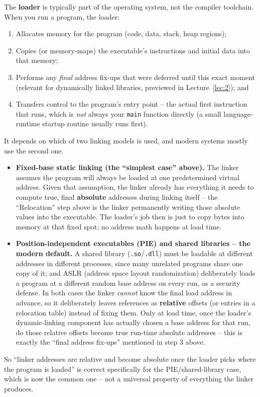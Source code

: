 \documentclass[full-course-notes.tex]{subfiles}
\begin{document}
\begin{coreidea}
The \textbf{loader} is typically part of the operating system, not the compiler toolchain. When
you run a program, the loader:
\begin{enumerate}
  \item Allocates memory for the program (code, data, stack, heap regions);
  \item Copies (or memory-maps) the executable's instructions and initial data into that memory;
  \item Performs any \emph{final} address fix-ups that were deferred until this exact moment
  (relevant for dynamically linked libraries, previewed in Lecture~\ref{lec:2}); and
  \item Transfers control to the program's entry point -- the actual first instruction that
  runs, which is \emph{not} always your \texttt{main} function directly (a small
  language-runtime startup routine usually runs first).
\end{enumerate}
\end{coreidea}

\begin{coreidea}
It depends on which of two linking models is used, and modern systems mostly use the second one.
\begin{itemize}
  \item \textbf{Fixed-base static linking (the ``simplest case'' above).} The linker assumes the
  program will always be loaded at one predetermined virtual address. Given that assumption, the
  linker already has everything it needs to compute true, final \textbf{absolute} addresses
  during linking itself -- the ``Relocation'' step above is the linker permanently writing those
  absolute values into the executable. The loader's job then is just to copy bytes into memory
  at that fixed spot; no address math happens at load time.
  \item \textbf{Position-independent executables (PIE) and shared libraries -- the modern
  default.} A shared library (\texttt{.so}/\texttt{.dll}) must be loadable at different addresses
  in different processes, since many unrelated programs share one copy of it; and ASLR (address
  space layout randomization) deliberately loads a program at a different random base address on
  every run, as a security defense. In both cases the linker \emph{cannot} know the final load
  address in advance, so it deliberately leaves references as \textbf{relative} offsets (or
  entries in a relocation table) instead of fixing them. Only at load time, once the loader's
  dynamic-linking component has actually chosen a base address for that run, do those relative
  offsets become true run-time absolute addresses -- this is exactly the ``final address
  fix-ups'' mentioned in step 3 above.
\end{itemize}
So ``linker addresses are relative and become absolute once the loader picks where the program
is loaded'' is correct specifically for the PIE/shared-library case, which is now the common
one -- not a universal property of everything the linker produces.
\end{coreidea}
\end{document}
